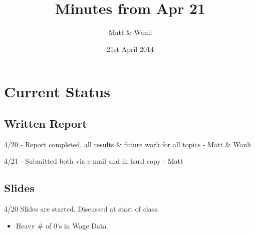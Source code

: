 \documentclass{article}
\title{Minutes from Apr 21}
\author{Matt \& Wanli}
\date{21st April 2014}
\begin{document}


\maketitle

\section{Current Status}
\subsection{Written Report}
4/20 - Report completed, all results \& future work for all topics - Matt \& Wanli

4/21 - Submitted both via e-mail and in hard copy - Matt

\subsection{Slides}
4/20 Slides are started. Discussed at start of class.
\begin{itemize}
\item Heavy \# of 0's in Wage Data
\end{itemize}
\end{document}
